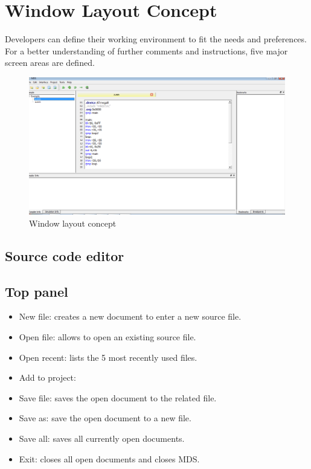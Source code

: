 \section{Window Layout Concept}
    Developers can define their working environment to fit the needs and preferences. For a better understanding of further comments and instructions, five major screen areas are defined. %
    \begin{figure}[h]
        \centering
        \includegraphics [width=.9\textwidth]{img/Demonstration_project.png}
        \caption{Window layout concept}
    \end{figure}

\subsection{Source code editor}

\subsection{Top panel}
    \begin{itemize}
        \item New file: creates a new document to enter a new source file.
        \item Open file: allows to open an existing source file.
        \item Open recent: lists the 5 most recently used files.
        \item Add to project:
        \item Save file: saves the open document to the related file.
        \item Save as: save the open document to a new file.
        \item Save all: saves all currently open documents.
        \item Exit: closes all open documents and closes MDS.
    \end{itemize}

